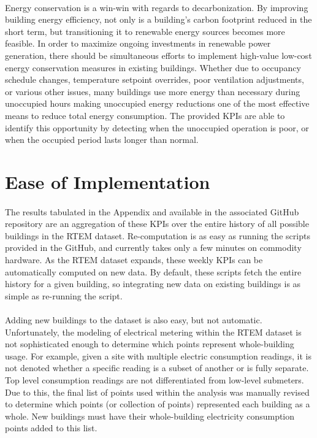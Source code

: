 \documentclass[a4paper]{article}
\begin{document}
\paragraph{}
Energy conservation is a win-win with regards to decarbonization. By improving building energy efficiency, not only is a building's carbon footprint reduced in the short term, but transitioning it to renewable energy sources becomes more feasible. In order to maximize ongoing investments in renewable power generation, there should be simultaneous efforts to implement high-value low-cost energy conservation measures in existing buildings. Whether due to occupancy schedule changes, temperature setpoint overrides, poor ventilation adjustments, or various other issues, many buildings use more energy than necessary during unoccupied hours making unoccupied energy reductions one of the most effective means to reduce total energy consumption. The provided KPIs are able to identify this opportunity by detecting when the unoccupied operation is poor, or when the occupied period lasts longer than normal.

\section{Ease of Implementation}

\paragraph{}
The results tabulated in the Appendix and available in the associated GitHub repository are an aggregation of these KPIs over the entire history of all possible buildings in the RTEM dataset. Re-computation is as easy as running the scripts provided in the GitHub, and currently takes only a few minutes on commodity hardware. As the RTEM dataset expands, these weekly KPIs can be automatically computed on new data. By default, these scripts fetch the entire history for a given building, so integrating new data on existing buildings is as simple as re-running the script.

\paragraph{}
Adding new buildings to the dataset is also easy, but not automatic. Unfortunately, the modeling of electrical metering within the RTEM dataset is not sophisticated enough to determine which points represent whole-building usage. For example, given a site with multiple electric consumption readings, it is not denoted whether a specific reading is a subset of another or is fully separate. Top level consumption readings are not differentiated from low-level submeters. Due to this, the final list of points used within the analysis was manually revised to determine which points (or collection of points) represented each building as a whole. New buildings must have their whole-building electricity consumption points added to this list.
\end{document}
